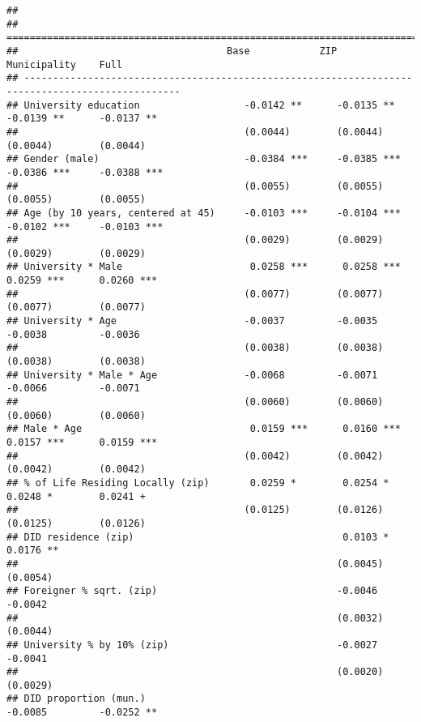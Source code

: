 \documentclass[
]{article}
\begin{document}
\begin{verbatim}
## 
## =================================================================================================
##                                    Base            ZIP             Municipality    Full          
## -------------------------------------------------------------------------------------------------
## University education                  -0.0142 **      -0.0135 **      -0.0139 **      -0.0137 ** 
##                                       (0.0044)        (0.0044)        (0.0044)        (0.0044)   
## Gender (male)                         -0.0384 ***     -0.0385 ***     -0.0386 ***     -0.0388 ***
##                                       (0.0055)        (0.0055)        (0.0055)        (0.0055)   
## Age (by 10 years, centered at 45)     -0.0103 ***     -0.0104 ***     -0.0102 ***     -0.0103 ***
##                                       (0.0029)        (0.0029)        (0.0029)        (0.0029)   
## University * Male                      0.0258 ***      0.0258 ***      0.0259 ***      0.0260 ***
##                                       (0.0077)        (0.0077)        (0.0077)        (0.0077)   
## University * Age                      -0.0037         -0.0035         -0.0038         -0.0036    
##                                       (0.0038)        (0.0038)        (0.0038)        (0.0038)   
## University * Male * Age               -0.0068         -0.0071         -0.0066         -0.0071    
##                                       (0.0060)        (0.0060)        (0.0060)        (0.0060)   
## Male * Age                             0.0159 ***      0.0160 ***      0.0157 ***      0.0159 ***
##                                       (0.0042)        (0.0042)        (0.0042)        (0.0042)   
## % of Life Residing Locally (zip)       0.0259 *        0.0254 *        0.0248 *        0.0241 +  
##                                       (0.0125)        (0.0126)        (0.0125)        (0.0126)   
## DID residence (zip)                                    0.0103 *                        0.0176 ** 
##                                                       (0.0045)                        (0.0054)   
## Foreigner % sqrt. (zip)                               -0.0046                         -0.0042    
##                                                       (0.0032)                        (0.0044)   
## University % by 10% (zip)                             -0.0027                         -0.0041    
##                                                       (0.0020)                        (0.0029)   
## DID proportion (mun.)                                                 -0.0085         -0.0252 ** 

\end{verbatim}
\end{document}

